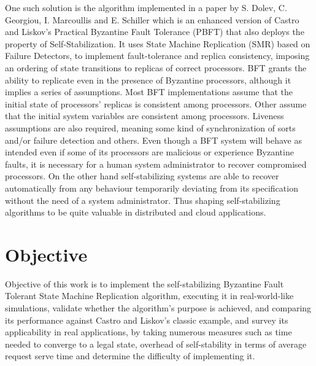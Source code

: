 \documentclass[12pt,a4paper]{report}
\begin{document}
				One such solution is the algorithm implemented in a paper by S. Dolev, C. Georgiou, I. Marcoullis and E. Schiller\cite{ssbft} which is an enhanced version of Castro and Liskov's Practical Byzantine Fault Tolerance (PBFT) \cite{pbft} that also deploys the
				property of Self-Stabilization. It uses State Machine Replication (SMR) based on Failure Detectors,
				to implement fault-tolerance and replica consistency, imposing an
				ordering of state transitions to replicas of correct processors. BFT grants the ability to replicate even in the presence of Byzantine
				processors, although it implies a series 
				of assumptions. Most BFT implementations assume that the initial state of processors' replicas is consistent among processors. Other assume 
				that the initial system variables are consistent among processors. Liveness assumptions are also required, meaning some kind of
				synchronization of sorts and/or failure detection and others. Even though a BFT system will behave as intended even if some of its processors
				are malicious or experience Byzantine faults, it is necessary for a human system administrator to recover compromised processors. On the other 
				hand  self-stabilizing systems are able to recover automatically from any behaviour temporarily deviating from its specification without the need of a system administrator. Thus 
				shaping self-stabilizing algorithms to be quite valuable in distributed and cloud applications.
		\section{Objective}
			    Objective of this work is to implement the self-stabilizing Byzantine Fault Tolerant State Machine Replication algorithm\cite{ssbft},
				executing it in real-world-like simulations, validate whether the algorithm's purpose is achieved, and comparing its performance against Castro and Liskov's classic example, and survey its
				applicability in real applications, by taking numerous measures such as time needed to converge to a legal state, overhead of self-stability
				in terms of average request serve time and determine the difficulty of implementing it.
\end{document}
